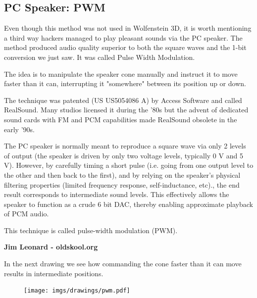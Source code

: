 \subsection{PC Speaker: PWM}
Even though this method was not used in Wolfenstein 3D, it is worth mentioning a third way hackers managed to play pleasant sounds via the PC speaker. The method produced audio quality superior to both the square waves and the 1-bit conversion we just saw. It was called Pulse Width Modulation.\\
\par
The idea is to manipulate the speaker cone manually and instruct it to move faster than it can, interrupting it "somewhere" between its position up or down.\\
\par
The technique was patented (US US5054086 A) by Access Software and called RealSound. Many studios licensed it during the '80s but the advent of dedicated sound cards with FM and PCM capabilities made RealSound obsolete in the early '90s.
\par
 \begin{fancyquotes}
  The PC speaker is normally meant to reproduce a square wave via only 2 levels of output (the speaker is driven by only two voltage levels, typically 0 V and 5 V). However, by carefully timing a short pulse (i.e. going from one output level to the other and then back to the first), and by relying on the speaker's physical filtering properties (limited frequency response, self-inductance, etc)., the end result corresponds to intermediate sound levels. This effectively allows the speaker to function as a crude 6 bit DAC, thereby enabling approximate playback of PCM audio.\\
  \par
  This technique is called pulse-width modulation (PWM).\\
  \par
  \textbf{Jim Leonard - oldskool.org}
 \end{fancyquotes}
\par
In the next drawing we see how commanding the cone faster than it can move results in intermediate positions.
\par
\begin{figure}[H]
  \centering
  \texttt{[image: imgs/drawings/pwm.pdf]}
  
\end{figure}
\par





